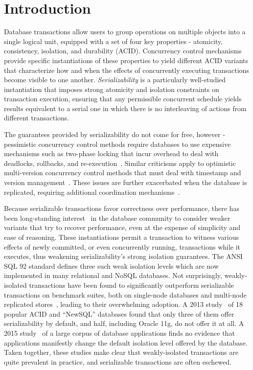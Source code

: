
\section{Introduction}

Database transactions allow users to group operations on multiple
objects into a single logical unit, equipped with a set of four key
properties - atomicity, consistency, isolation, and durability (ACID).
Concurrency control mechanisms provide specific instantiations of
these properties to yield different ACID variants that characterize
how and when the effects of concurrently executing transactions become
visible to one another.  \emph{Serializability} is a particularly
well-studied instantiation that imposes strong atomicity and isolation
constraints on transaction execution, ensuring that any permissible
concurrent schedule yields results equivalent to a serial one in which
there is no interleaving of actions from different transactions.

The guarantees provided by serializability do not come for free,
however - pessimistic concurrency control methods require databases to
use expensive mechanisms such as two-phase locking that incur overhead
to deal with deadlocks, rollbacks, and
re-execution~\cite{twopl,ullmanbook}.  Similar criticisms apply to
optimistic multi-version concurrency control methods that must deal
with timestamp and version management~\cite{BG81}.  These issues are
further exacerbated when the database is replicated, requiring
additional coordination
mechanisms~\cite{cap,sernotavlbl,bailishat,bernsigmod13}.

Because serializable transactions favor correctness over performance,
there has been long-standing interest~\cite{gray1976} in the database
community to consider weaker variants that try to recover performance,
even at the expense of simplicity and ease of reasoning.  These
instantiations permit a transaction to witness various effects of
newly committed, or even concurrently running, transactions while it
executes, thus weakening serializability's strong isolation
guarantees.  The ANSI SQL 92 standard defines three such weak
isolation levels which are now implemented in many relational and
NoSQL databases. Not surprisingly, weakly-isolated transactions have
been found to significantly outperform serializable transactions on
benchmark suites, both on single-node databases and multi-node
replicated stores~\cite{dbtuningbook,bailishat,bailisvldb}, leading to
their overwhelming adoption. A 2013 study~\cite{bailishotos} of 18
popular ACID and ``NewSQL'' databases found that only three of them
offer serializability by default, and half, including Oracle 11g, do
not offer it at all.  A 2015 study~\cite{bailisferal} of a large
corpus of database applications finds no evidence that applications
manifestly change the default isolation level offered by the
database. Taken together, these studies make clear that
weakly-isolated transactions are quite prevalent in practice, and
serializable transactions are often eschewed.

